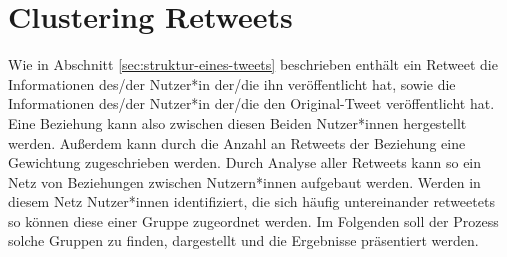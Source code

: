 \chapter{Clustering Retweets}
\label{chap:cluster_retweets}
Wie in Abschnitt \ref{sec:struktur-eines-tweets} beschrieben enthält ein \gls{Retweet} die Informationen des/der Nutzer*in der/die ihn veröffentlicht hat, sowie die Informationen des/der Nutzer*in der/die den Original-Tweet veröffentlicht hat. Eine Beziehung kann also zwischen diesen Beiden Nutzer*innen hergestellt werden. Außerdem kann durch die Anzahl an \glspl{Retweet} der Beziehung eine Gewichtung zugeschrieben werden. Durch Analyse aller \glspl{Retweet} kann so ein Netz von Beziehungen zwischen Nutzern*innen aufgebaut werden.
Werden in diesem Netz Nutzer*innen identifiziert, die sich häufig untereinander \glspl{retweetet} so können diese einer Gruppe zugeordnet werden. Im Folgenden soll der Prozess solche Gruppen zu finden, dargestellt und die Ergebnisse präsentiert werden.

